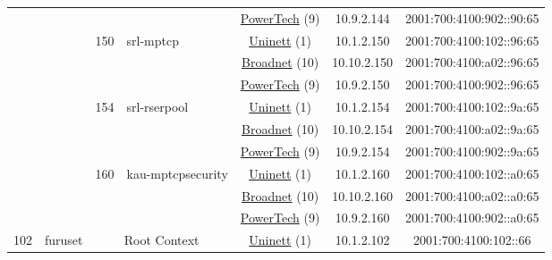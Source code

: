 \begin{small}
\begin{center}
\begin{longtable}{|c|c|c|c|c|c|c|c|}
  &  &  &  & \multicolumn{2}{|c|}{\tiny{\href{http://www.powertech.no}{PowerTech} (9)}} & \tiny{10.9.2.144} & \tiny{2001:700:4100:902::90:65} \\* \cline{3-3}\cline{4-4}\cline{5-5}\cline{6-6}\cline{7-7}\cline{8-8}
  &  & \multirow{3}{*}{\tiny{150}} & \multicolumn{1}{|l|}{\multirow{3}{*}{\tiny{srl-mptcp}}} & \multicolumn{2}{|c|}{\tiny{\href{https://www.uninett.no}{Uninett} (1)}} & \tiny{10.1.2.150} & \tiny{2001:700:4100:102::96:65} \\* \cline{5-5}\cline{6-6}\cline{7-7}\cline{8-8}
  &  &  &  & \multicolumn{2}{|c|}{\tiny{\href{https://www.broadnet.no}{Broadnet} (10)}} & \tiny{10.10.2.150} & \tiny{2001:700:4100:a02::96:65} \\* \cline{5-5}\cline{6-6}\cline{7-7}\cline{8-8}
  &  &  &  & \multicolumn{2}{|c|}{\tiny{\href{http://www.powertech.no}{PowerTech} (9)}} & \tiny{10.9.2.150} & \tiny{2001:700:4100:902::96:65} \\* \cline{3-3}\cline{4-4}\cline{5-5}\cline{6-6}\cline{7-7}\cline{8-8}
  &  & \multirow{3}{*}{\tiny{154}} & \multicolumn{1}{|l|}{\multirow{3}{*}{\tiny{srl-rserpool}}} & \multicolumn{2}{|c|}{\tiny{\href{https://www.uninett.no}{Uninett} (1)}} & \tiny{10.1.2.154} & \tiny{2001:700:4100:102::9a:65} \\* \cline{5-5}\cline{6-6}\cline{7-7}\cline{8-8}
  &  &  &  & \multicolumn{2}{|c|}{\tiny{\href{https://www.broadnet.no}{Broadnet} (10)}} & \tiny{10.10.2.154} & \tiny{2001:700:4100:a02::9a:65} \\* \cline{5-5}\cline{6-6}\cline{7-7}\cline{8-8}
  &  &  &  & \multicolumn{2}{|c|}{\tiny{\href{http://www.powertech.no}{PowerTech} (9)}} & \tiny{10.9.2.154} & \tiny{2001:700:4100:902::9a:65} \\* \cline{3-3}\cline{4-4}\cline{5-5}\cline{6-6}\cline{7-7}\cline{8-8}
  &  & \multirow{3}{*}{\tiny{160}} & \multicolumn{1}{|l|}{\multirow{3}{*}{\tiny{kau-mptcpsecurity}}} & \multicolumn{2}{|c|}{\tiny{\href{https://www.uninett.no}{Uninett} (1)}} & \tiny{10.1.2.160} & \tiny{2001:700:4100:102::a0:65} \\* \cline{5-5}\cline{6-6}\cline{7-7}\cline{8-8}
  &  &  &  & \multicolumn{2}{|c|}{\tiny{\href{https://www.broadnet.no}{Broadnet} (10)}} & \tiny{10.10.2.160} & \tiny{2001:700:4100:a02::a0:65} \\* \cline{5-5}\cline{6-6}\cline{7-7}\cline{8-8}
  &  &  &  & \multicolumn{2}{|c|}{\tiny{\href{http://www.powertech.no}{PowerTech} (9)}} & \tiny{10.9.2.160} & \tiny{2001:700:4100:902::a0:65} \\ \hline
 \multirow{27}{*}{\tiny{102}} & \multicolumn{1}{|l|}{\multirow{27}{*}{\tiny{furuset}}} & \multicolumn{2}{|c|}{\multirow{3}{*}{\tiny{Root Context}}} & \multicolumn{2}{|c|}{\tiny{\href{https://www.uninett.no}{Uninett} (1)}} & \tiny{10.1.2.102} & \tiny{2001:700:4100:102::66} \\* \cline{5-5}\cline{6-6}\cline{7-7}\cline{8-8}

\end{longtable}
\end{center}
\end{small}
